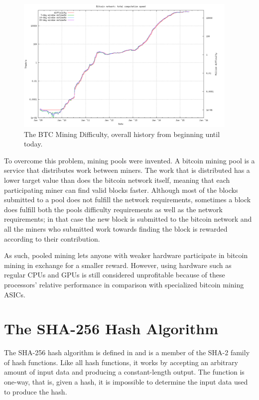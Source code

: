 \begin{figure}[htb]
    \centering
    \includegraphics[width=0.95\textwidth]{Figures/Bitcoin/Difficulty-all}
    \caption{The BTC Mining Difficulty, overall history from beginning until today.}
    \label{fig:difficulty}
\end{figure}

To overcome this problem, mining pools were invented. A bitcoin mining pool is a service that distributes
work between miners. The work that is distributed has a lower target value than does the bitcoin network
itself, meaning that each participating miner can find valid blocks faster. Although most of the blocks
submitted to a pool does not fulfill the network requirements, sometimes a block does fulfill both the
pools difficulty requirements as well as the network requirements; in that case the new block is
submitted to the bitcoin network and all the miners who submitted work towards finding the block
is rewarded according to their contribution.

As such, pooled mining lets anyone with weaker hardware participate in bitcoin mining in exchange for
a smaller reward. However, using hardware such as regular CPUs and GPUs is still considered unprofitable
because of these processors' relative performance in comparison with specialized bitcoin mining ASICs.

\section{The SHA-256 Hash Algorithm}

The SHA-256 hash algorithm is defined in  and is a member of the SHA-2
family of hash functions. Like all hash functions, it works by accepting an arbitrary
amount of input data and producing a constant-length output. The function is one-way,
that is, given a hash, it is impossible to determine the input data used to produce
the hash.

